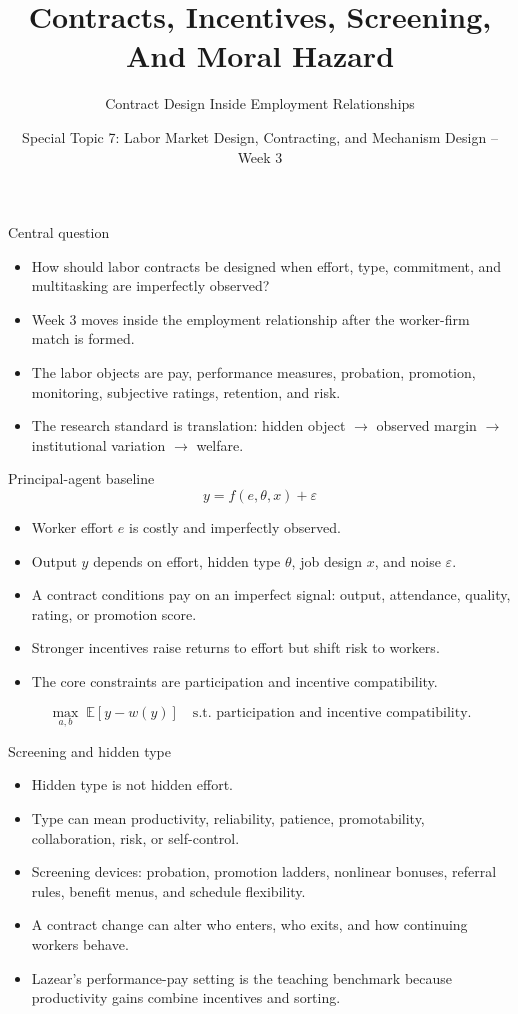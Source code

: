 \documentclass[aspectratio=169,11pt]{beamer}
\title{Contracts, Incentives, Screening, And Moral Hazard}
\subtitle{Contract Design Inside Employment Relationships}
\author{Special Topic 7: Labor Market Design, Contracting, and Mechanism Design -- Week 3}
\date{}
\begin{document}
\begin{frame}
  \titlepage
\end{frame}

\begin{frame}{Central question}
\begin{itemize}
    \item How should labor contracts be designed when effort, type, commitment, and multitasking are imperfectly observed?
    \item Week 3 moves inside the employment relationship after the worker-firm match is formed.
    \item The labor objects are pay, performance measures, probation, promotion, monitoring, subjective ratings, retention, and risk.
    \item The research standard is translation: hidden object $\rightarrow$ observed margin $\rightarrow$ institutional variation $\rightarrow$ welfare.
\end{itemize}
\end{frame}

\begin{frame}{Principal-agent baseline}
\small
\[
  y = f(e,\theta,x) + \varepsilon
\]
\begin{itemize}
    \item Worker effort $e$ is costly and imperfectly observed.
    \item Output $y$ depends on effort, hidden type $\theta$, job design $x$, and noise $\varepsilon$.
    \item A contract conditions pay on an imperfect signal: output, attendance, quality, rating, or promotion score.
    \item Stronger incentives raise returns to effort but shift risk to workers.
    \item The core constraints are participation and incentive compatibility.
\end{itemize}
\[
  \max_{a,b} \; \mathbb{E}[y-w(y)]
  \quad \text{s.t. participation and incentive compatibility.}
\]
\end{frame}

\begin{frame}{Screening and hidden type}
\begin{itemize}
    \item Hidden type is not hidden effort.
    \item Type can mean productivity, reliability, patience, promotability, collaboration, risk, or self-control.
    \item Screening devices: probation, promotion ladders, nonlinear bonuses, referral rules, benefit menus, and schedule flexibility.
    \item A contract change can alter who enters, who exits, and how continuing workers behave.
    \item Lazear's performance-pay setting is the teaching benchmark because productivity gains combine incentives and sorting.
\end{itemize}
\end{frame}
\end{document}
